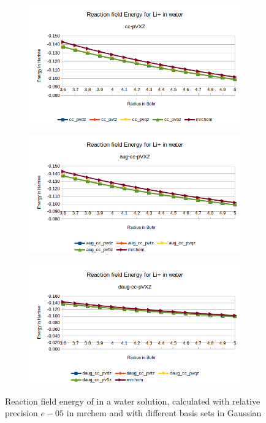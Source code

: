 \documentclass[../master_thesis.tex]{subfiles}
\begin{document}
\begin{figure}[h!]
  \centering
  \begin{subfigure}[b]{0.75\linewidth}
    \includegraphics[width=\linewidth]{img/Erlip.png}
  \end{subfigure}
  \begin{subfigure}[b]{0.75\linewidth}
    \includegraphics[width=\linewidth]{img/Erauglip.png}
  \end{subfigure}
  \begin{subfigure}[b]{0.75\linewidth}
    \includegraphics[width=\linewidth]{img/Erdauglip.png}
  \end{subfigure}
  \caption{Reaction field energy of  in a water solution, calculated with relative precision $e-05$ in mrchem
  and with different basis sets in Gaussian}
  \label{fig:lipEnergyplots}
\end{figure}
\end{document}
